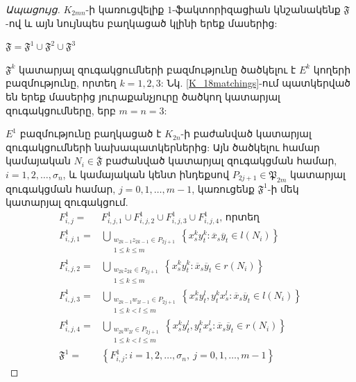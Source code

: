 \begin{proof}[Ապացույց]
$K_{2mn}$-ի կառուցվելիք $1$-ֆակտորիզացիան կնշանակենք $\mathfrak{F}$-ով և այն նույնպես բաղկացած կլինի երեք մասերից:

\begin{center}
$\mathfrak{F} = \mathfrak{F}^1 \cup \mathfrak{F}^2 \cup \mathfrak{F}^3$
\end{center}

$\mathfrak{F}^k$ կատարյալ զուգակցումների բազմությունը ծածկելու է $E^k$ կողերի բազմությունը, որտեղ $k=1,2,3$: Նկ. \ref{K_18matchings}-ում պատկերված են երեք մասերից յուրաքանչյուրը ծածկող կատարյալ զուգակցումները, երբ $m=n=3$:

$E^1$ բազմությունը բաղկացած է $K_{2n}$-ի բաժանված կատարյալ զուգակցումների նախապատկերներից: Այն ծածկելու համար կամայական $N_i \in \overline{\mathfrak{F}}$ բաժանված կատարյալ զուգակցման համար, $i=1,2,\ldots,\sigma_n$, և կամայական կենտ ինդեքսով $P_{2j+1} \in \mathfrak{P}_{2m}$ կատարյալ զուգակցման համար, $j=0,1,\ldots,m-1$, կառուցենք $\mathfrak{F}^1$-ի մեկ կատարյալ զուգակցում. 
\begin{align*}
F^1_{i,j} = &F^1_{i,j,1} \cup F^1_{i,j,2} \cup F^1_{i,j,3} \cup F^1_{i,j,4}\text{, որտեղ }\\
F^1_{i,j,1} = &\bigcup\limits_{\substack{w_{2k-1}z_{2k-1} \in P_{2j+1} \\ 1 \leq k \leq m}}
\left\{x_s^ky_t^k : \overline{x}_s\overline{y}_t \in l(N_i)\right\} \\
F^1_{i,j,2} = &\bigcup\limits_{\substack{w_{2k}z_{2k} \in P_{2j+1} \\ 1 \leq k \leq m}}
\left\{x_s^ky_t^k : \overline{x}_s\overline{y}_t \in r(N_i)\right\} \\
F^1_{i,j,3} = &\bigcup\limits_{\substack{w_{2k-1}w_{2l-1} \in P_{2j+1} \\ 1 \leq k < l \leq m}}
\left\{x_s^ky_t^l, y_t^kx_s^l : \overline{x}_s\overline{y}_t \in l(N_i)\right\} \\
F^1_{i,j,4} = &\bigcup\limits_{\substack{w_{2k}w_{2l} \in P_{2j+1} \\ 1 \leq k < l \leq m}}
\left\{x_s^ky_t^l, y_t^kx_s^l : \overline{x}_s\overline{y}_t \in r(N_i)\right\}\\
\mathfrak{F}^1 = &\left\{F^1_{i,j} : i=1,2,\ldots,\sigma_n,\ j=0,1,\ldots,m-1\right\}
\end{align*}


\end{proof}

